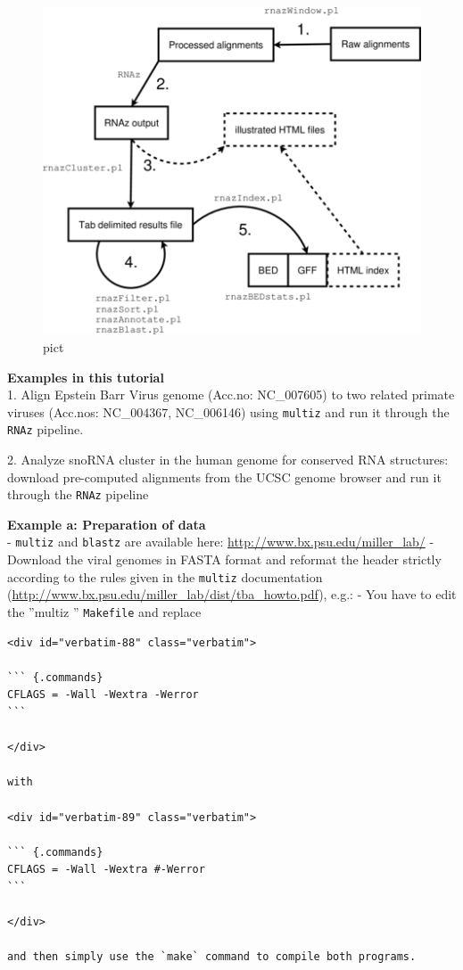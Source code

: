 \documentclass[]{article}
\begin{document}
\begin{figure}[htbp]
\centering
\includegraphics{Figs/flowchart.png}
\caption{pict}
\end{figure}

\textbf{Examples in this tutorial}\\
1. Align Epstein Barr Virus genome (Acc.no: NC\_007605) to two related
primate viruses (Acc.nos: NC\_004367, NC\_006146) using \texttt{multiz}
and run it through the \texttt{RNAz} pipeline.
 2. Analyze snoRNA cluster in the human genome
for conserved RNA structures: download pre-computed alignments from the
UCSC genome browser and run it through the \texttt{RNAz} pipeline

\textbf{Example a: Preparation of data}\\
- \texttt{multiz} and \texttt{blastz} are available here:
\url{http://www.bx.psu.edu/miller_lab/} - Download the viral genomes in
FASTA format and reformat the header strictly according to the rules
given in the \texttt{multiz} documentation
(\url{http://www.bx.psu.edu/miller_lab/dist/tba_howto.pdf}), e.g.: - You
have to edit the ''multiz '' \texttt{Makefile} and replace

\begin{verbatim}
<div id="verbatim-88" class="verbatim">

``` {.commands}
CFLAGS = -Wall -Wextra -Werror
```

</div>

with

<div id="verbatim-89" class="verbatim">

``` {.commands}
CFLAGS = -Wall -Wextra #-Werror
```

</div>

and then simply use the `make` command to compile both programs.
\end{verbatim}
\end{document}
